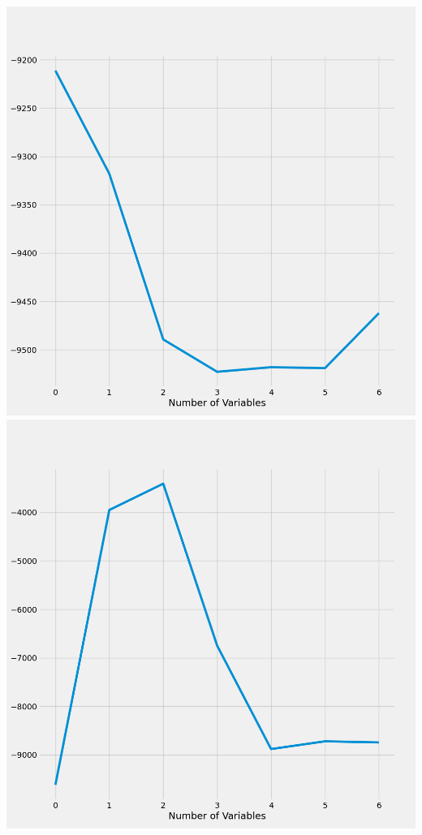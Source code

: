 \documentclass{article}
\begin{document}
	\includegraphics[scale = 0.2]{../plots/python/AICConcreteForward3L.png} 
	\includegraphics[scale = 0.2]{../plots/python/AICConcreteBackward3L.png}
\end{document}
